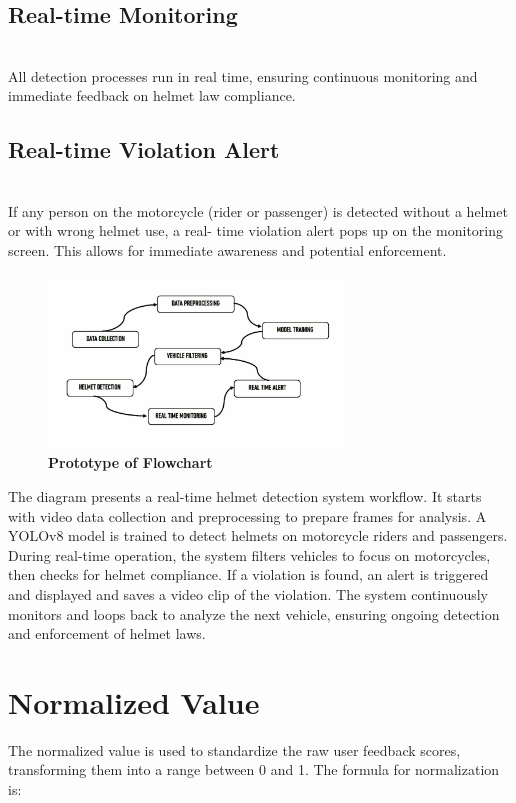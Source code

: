\begin{refsection}
\subsection {Real-time Monitoring} \\
All detection processes run in real time, ensuring continuous monitoring and immediate feedback on helmet law compliance.

\subsection {Real-time Violation Alert} \\
If any person on the motorcycle (rider or passenger) is detected without a helmet or with wrong helmet use, a real- time violation alert pops up on the monitoring screen. This allows for immediate awareness and potential enforcement.


\begin{figure}[H]
    \centering
    \includegraphics[width=0.7\textwidth]{figures/Fig 5.jpg}
    \caption{\textbf{Prototype of Flowchart}}
    \label{figures/Fig 5.jpg}
\end{figure}

The diagram presents a real-time helmet detection system workflow. It starts with video data collection and preprocessing to prepare frames for analysis. A YOLOv8 model is trained to detect helmets on motorcycle riders and passengers. 
During real-time operation, the system filters vehicles to focus on motorcycles, then checks for helmet compliance. If a violation is found, an alert is triggered and displayed and saves a video clip of the violation. The system continuously monitors and loops back to analyze the next vehicle, ensuring ongoing detection and enforcement of helmet laws.

\noindent

\section*{Normalized Value}
The normalized value is used to standardize the raw user feedback scores, transforming them into a range between 0 and 1. The formula for normalization is:



\end{refsection}
